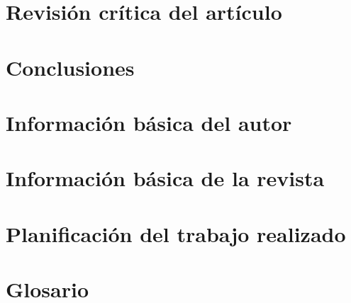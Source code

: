 \documentclass[a4paper,11pt]{report}
\begin{document}
\chapter{Revisión crítica del artículo}

\chapter{Conclusiones}






\chapter*{Información básica del autor}


\chapter*{Información básica de la revista}


\chapter*{Planificación del trabajo realizado}


\chapter*{Glosario}
\end{document}
